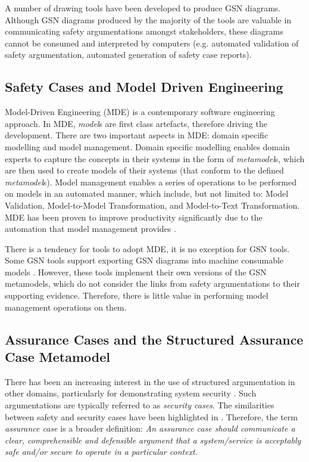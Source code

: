 A number of drawing tools have been developed \cite{denney2017tool, matsuno2010dependability, netkachova2014tool, larrucea2017supporting, yorkgsn, barry2011certware} to produce GSN diagrams. 
Although GSN diagrams produced by the majority of the tools are valuable in communicating safety argumentations amongst stakeholders, these diagrams cannot be consumed and interpreted by computers (e.g. automated validation of safety argumentation, automated generation of safety case reports). 


\subsection{Safety Cases and Model Driven Engineering}
Model-Driven Engineering (MDE) is a contemporary software engineering approach. 
In MDE, \textit{model}s are first class artefacts, therefore driving the development. 
There are two important aspects in MDE: domain specific modelling and model management. 
Domain specific modelling enables domain experts to capture the concepts in their systems in the form of \textit{metamodel}s, which are then used to create models of their systems (that conform to the defined \textit{metamodel}s). 
Model management enables a series of operations to be performed on models in an automated manner, which include, but not limited to: Model Validation, Model-to-Model Transformation, and Model-to-Text Transformation.
MDE has been proven to improve productivity significantly due to the automation that model management provides \cite{jaaksi2002developing, karna2009evaluating}. 

There is a tendency for tools to adopt MDE, it is no exception for GSN tools. 
Some GSN tools support exporting GSN diagrams into machine consumable models \cite{barry2011certware, larrucea2017supporting}.
However, these tools implement their own versions of the GSN metamodels, which do not consider the links from safety argumentations to their supporting evidence. 
Therefore, there is little value in performing model management operations on them.


\subsection{Assurance Cases and the Structured Assurance Case Metamodel}
There has been an increasing interest in the use of structured argumentation in other domains, particularly for demonstrating system security \cite{bloomfield2010safety}. 
Such argumentations are typically referred to as \textit{security cases}. 
The similarities between safety and security cases have been highlighted in \cite{lautieri2005safsec}. 
Therefore, the term \textit{assurance case} is a broader definition: \textit{An assurance case should communicate a clear, comprehensible and defensible argument that a system/service is acceptably safe and/or secure to operate in a particular context.} 

